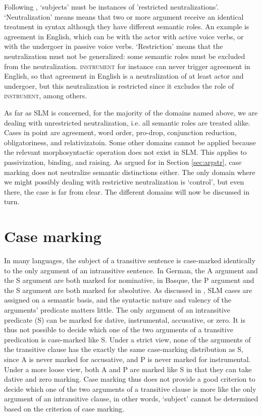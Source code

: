 Following \citet[250ff]{VanValinEtAl1997}, `subjects' must be instances of 'restricted neutralizations'. `Neutralization' means means that two or more argument receive an identical treatment in syntax although they have different semantic roles. An example is agreement in English, which can be with the actor with active voice verbs, or with the undergoer in passive voice verbs. `Restriction' means that the neutralization must not be generalized: some semantic roles must be excluded from the neutralization. \textsc{instrument} for instance can never trigger agreement in English, so that agreement in English is a neutralization of at least actor and undergoer, but this neutralization is restricted since it excludes the role of \textsc{instrument}, among others.

As far as SLM is concerned, for the majority of the domains named above, we are dealing with unrestricted neutralization, i.e. all semantic roles are treated alike. Cases in point are agreement, word order, pro-drop, conjunction reduction, obligatoriness, and relativizatoin. Some other domains cannot be applied because the relevant morphosyntactic operation does not exist in SLM. This applies to passivization, binding, and raising. As argued for in Section \ref{sec:argstr}, case marking does not neutralize semantic distinctions either. The only domain where we might possibly dealing with restrictive neutralization is `control', but even there, the case is far from clear. The different domains will now be discussed in turn. 

 

\section{Case marking}\label{sec:grel:Casemarking}
In many languages, the subject of a transitive sentence is case-marked identically to the only argument of an intransitive sentence. In German, the A argument and the S argument are both marked for nominative, in Basque, the P argument and the S argument are both marked for absolutive. 
As discussed in , SLM cases are assigned on a semantic basis, and the syntactic nature and valency of the arguments' predicate matters little. The only argument of an intransitive predicate (S) can be marked for dative, instrumental, accusative, or zero. It is thus not possible to decide which one of the two arguments of a transitive predication is case-marked like S. Under a strict view, none of the arguments of the transitive clause has the exactly the same case-marking distribution as S, since A is never marked for accusative, and P is never marked for instrumental. Under a more loose view, both A and P are marked like S in that they can take dative and zero marking. Case marking thus does not provide a good criterion to decide which one of the two arguments of a transitive clause is more like the only argument of an intransitive clause, in other words, `subject' cannot be determined based on the criterion of case marking.

